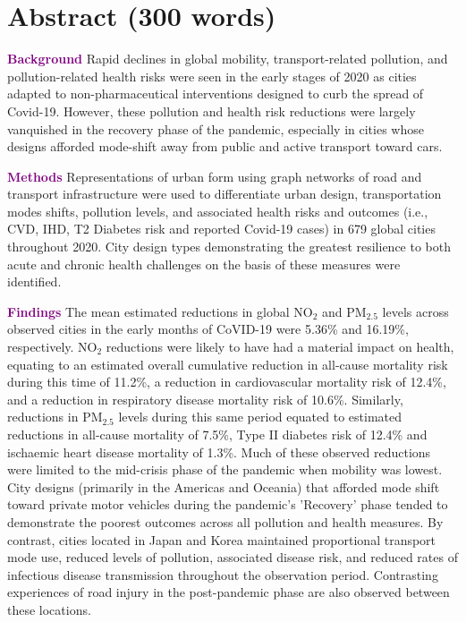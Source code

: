 \documentclass[preprint,12pt]{elsarticle}
\newcommand{\absdiv}[1]{%
  \par\addvspace{.5\baselineskip}%
  \noindent\textbf{#1}\quad\ignorespaces}
\begin{document}
\section*{Abstract (300 words)}
 \absdiv{\textcolor{purple}{Background}}
Rapid declines in global mobility, transport-related pollution, and pollution-related health risks were seen in the early stages of 2020 as cities adapted to non-pharmaceutical interventions designed to curb the spread of Covid-19. However, these pollution and health risk reductions were largely vanquished in the recovery phase of the pandemic, especially in cities whose designs afforded mode-shift away from public and active transport toward cars. 
 \absdiv{\textcolor{purple}{Methods}}
Representations of urban form using graph networks of road and transport infrastructure were used to differentiate urban design, transportation modes shifts, pollution levels, and associated health risks and outcomes (i.e., CVD, IHD, T2 Diabetes risk and reported Covid-19 cases) in 679 global cities throughout 2020. City design types demonstrating the greatest resilience to both acute and chronic health challenges on the basis of these measures were identified.
 \absdiv{\textcolor{purple}{Findings}}
The mean estimated reductions in global NO$_{2}$ and PM$_{2.5}$ levels across observed cities in the early months of CoVID-19 were 5.36\% and 16.19\%, respectively. NO$_{2}$ reductions were likely to have had a material impact on health, equating to an estimated overall cumulative reduction in all-cause mortality risk during this time of 11.2\%, a reduction in cardiovascular mortality risk of 12.4\%, and a reduction in respiratory disease mortality risk of 10.6\%. Similarly, reductions in PM$_{2.5}$ levels during this same period equated to estimated reductions in all-cause mortality of 7.5\%, Type II diabetes risk of 12.4\% and ischaemic heart disease mortality of 1.3\%. Much of these observed reductions were limited to the mid-crisis phase of the pandemic when mobility was lowest. City designs  (primarily in the Americas and Oceania) that afforded mode shift toward private motor vehicles during the pandemic's 'Recovery' phase tended to demonstrate the poorest outcomes across all pollution and health measures. By contrast, cities located in Japan and Korea maintained proportional transport mode use, reduced levels of pollution, associated disease risk, and reduced rates of infectious disease transmission throughout the observation period. Contrasting experiences of road injury in the post-pandemic phase are also observed between these locations. 
\end{document}
